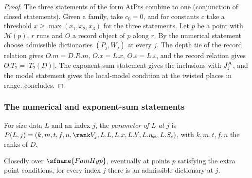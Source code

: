 \begin{proof}
The three statements of the form $\mathrm{AtPts}$ combine to one (conjunction of closed statements). Given a family, take $c_0=0$, and
for constants $c$ take a threshold $x\ge\max(x_1,x_2,x_3)$ for the three statements. Let $p$ be a point with $\mathcal M(p)$, $r$ runs and
$O$ a record object of $p$ along $r$. By the numerical statement choose admissible dictionaries $(P_j,W_j)$ at every $j$. The depth tie
of the record relation gives $O.m=D.R.m$, $O.x=L.x$, $O.\varepsilon=L.\varepsilon$, and the record relation gives $O.T_2=|T_2(D)|$. The
exponent-sum statement gives the inclusions with $J^{\mathrm{A}}_j$, and the model statement gives the local-model condition at the twisted
places in range.  concludes.
\end{proof}

\subsubsection{The numerical and exponent-sum statements}\label{sec:pf:onto2:sum}

\begin{definition}\label{pf:onto2:parof}
For size data $L$ and an index $j$, the \emph{parameter of $L$ at $j$} is $P(L,j)=(k,m,t,f,n,\rank V_j,L.L,L.x,L.b',L.\eta_{\mathrm{sz}},
L.S_c)$, with $k,m,t,f,n$ the ranks of $D$.
\end{definition}

\begin{proposition}\label{pf:onto2:numst}
Closedly over $\sfname{FamHyp}$, eventually at points $p$ satisfying the extra point conditions, for every index $j$ there is an
admissible dictionary at $j$.
\end{proposition}

